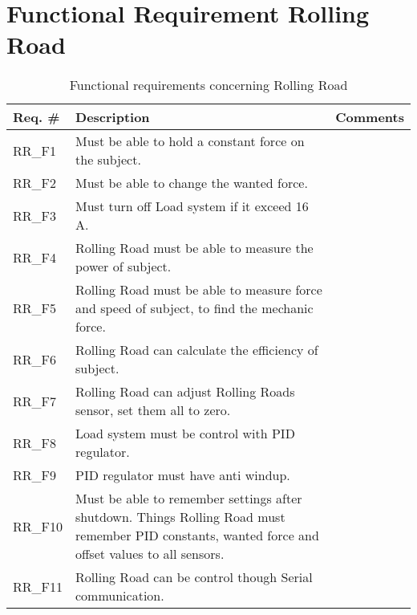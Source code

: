 \section{Functional Requirement Rolling Road}

\begin{table}[h!]
	\label{FREQ_AU2}
	\centering
	\begin{tabular}{|p{2 cm}|p{10 cm}|p{2 cm}|}
		\hline
		\textbf{Req. \#} & \textbf{Description} & \textbf{Comments} \\\hline
		RR\_F1
		& Must be able to hold a constant force on the subject.
		&  \\ \hline
		RR\_F2
		& Must be able to change the wanted force. 
		&  \\ \hline
		RR\_F3
		& Must turn off Load system if it exceed 16 A.
		&  \\ \hline
		RR\_F4
		& Rolling Road must be able to measure the power of subject.
		&  \\ \hline
		RR\_F5
		& Rolling Road must be able to measure force and speed of subject, to find the mechanic force.
		&  \\ \hline
		RR\_F6
		& Rolling Road can calculate the efficiency of subject. 
		&  \\ \hline
		RR\_F7
		& Rolling Road can adjust Rolling Roads sensor, set them all to zero. 
		&  \\ \hline
		RR\_F8
		& Load system must be control with PID regulator.
		&  \\ \hline
		RR\_F9
		& PID regulator must have anti windup.
		&  \\ \hline
		RR\_F10
		& Must be able to remember settings after shutdown. Things Rolling Road must remember PID constants, wanted force and offset values to all sensors.
		&  \\ \hline
		RR\_F11
		& Rolling Road can be control though Serial communication.  
		&  \\ \hline
	\end{tabular}
	\caption{Functional requirements concerning Rolling Road}
\end{table}

